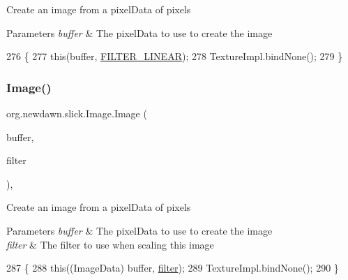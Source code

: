 Create an image from a pixel\+Data of pixels


\begin{DoxyParams}{Parameters}
{\em buffer} & The pixel\+Data to use to create the image \\
\hline
\end{DoxyParams}

\begin{DoxyCode}
276                               \{
277         \textcolor{keyword}{this}(buffer, \mbox{\hyperlink{classorg_1_1newdawn_1_1slick_1_1_image_ad3ba5404a81c4fad40140cbd517fae3d}{FILTER\_LINEAR}});
278         TextureImpl.bindNone();
279     \}
\end{DoxyCode}
\mbox{\label{classorg_1_1newdawn_1_1slick_1_1_image_a9c15ce123caa1346f628ad9b7ede7c4d}} 
\subsubsection{\texorpdfstring{Image()}{Image()}\hspace{0.1cm}{\footnotesize\ttfamily [14/16]}}
{\footnotesize\ttfamily org.\+newdawn.\+slick.\+Image.\+Image (\begin{DoxyParamCaption}\item[{\mbox{\hyperlink{classorg_1_1newdawn_1_1slick_1_1_image_buffer}{Image\+Buffer}}}]{buffer,  }\item[{int}]{filter }\end{DoxyParamCaption})\hspace{0.3cm}{\ttfamily [inline]}, {\ttfamily [package]}}

Create an image from a pixel\+Data of pixels


\begin{DoxyParams}{Parameters}
{\em buffer} & The pixel\+Data to use to create the image \\
\hline
{\em filter} & The filter to use when scaling this image \\
\hline
\end{DoxyParams}

\begin{DoxyCode}
287                                           \{
288         \textcolor{keyword}{this}((ImageData) buffer, \mbox{\hyperlink{classorg_1_1newdawn_1_1slick_1_1_image_a1c6f09687817420f3762f32bb1c3ed76}{filter}});
289         TextureImpl.bindNone();
290     \}
\end{DoxyCode}
\mbox{\label{classorg_1_1newdawn_1_1slick_1_1_image_a939604bdc60e07135a425956b181f751}} 
